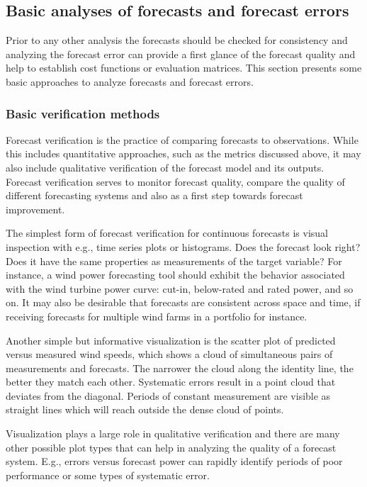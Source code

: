\subsection{Basic analyses of forecasts and forecast errors}
Prior to any other analysis the forecasts should be checked for consistency and analyzing the forecast error can provide a first glance of the forecast quality and help to establish cost functions or evaluation matrices.
This section presents some basic approaches to analyze forecasts and forecast errors.

\subsubsection{Basic verification methods}
Forecast verification is the practice of comparing forecasts to observations. While this includes quantitative approaches, such as the metrics discussed above, it may also include qualitative verification of the forecast model and its outputs. Forecast verification serves to monitor forecast quality, compare the quality of different forecasting systems and also as a first step towards forecast improvement. 

The simplest form of forecast verification for continuous forecasts is visual inspection with e.g., time series plots or histograms. Does the forecast look right? Does it have the same properties as measurements of the target variable? For instance, a wind power forecasting tool should exhibit the behavior associated with the wind turbine power curve: cut-in, below-rated and rated power, and so on. It may also be desirable that forecasts are consistent across space and time, if receiving forecasts for multiple wind farms in a portfolio for instance. 

Another simple but informative visualization is the scatter plot of predicted versus measured wind speeds, which shows a cloud of simultaneous pairs of measurements and forecasts. The narrower the cloud along the identity line, the better they match each other. Systematic errors result in a point cloud that deviates from the diagonal. Periods of constant measurement are visible as straight lines which will reach outside the dense cloud of points.  

\color[red]{Example time series and scatter plot}


Visualization plays a large role in qualitative verification and there are many other possible plot types that can help in analyzing the quality of a forecast system.
E.g., errors versus forecast power can rapidly identify periods of poor performance or some types of systematic error.

